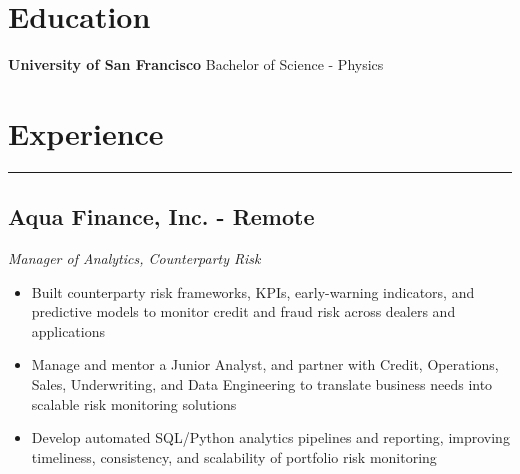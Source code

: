 \documentclass[11pt,a4paper]{article}
\newenvironment{myitemize}
{ \begin{itemize}[label={--}, leftmargin=*]
		\setlength{\itemsep}{0pt}
		\setlength{\parskip}{0pt}
		\setlength{\parsep}{0pt}     }
	{ \end{itemize}                  }
\begin{document}
	

\section*{Education}
	\vspace{-8mm} %
	\noindent\makebox[\linewidth]{\rule{\textwidth}{0.4pt}}
	\textbf{University of San Francisco} \hfill Bachelor of Science - Physics \\

		\vspace{-10mm} %

	\section*{Experience}
	\vspace{-4mm} %
	\hrule
	\vspace{2mm} %
	
	
	
\subsection*{Aqua Finance, Inc. - Remote \hfill
	\vspace{-1mm}
	 }
\vspace{-1.5mm}
\textit{Manager of Analytics, Counterparty Risk}
\vspace{-2.5mm}
\begin{myitemize}
	\item Built counterparty risk frameworks, KPIs, early-warning indicators, and predictive models to monitor credit and fraud risk across dealers and applications
	\item Manage and mentor a Junior Analyst, and partner with Credit, Operations, Sales, Underwriting, and Data Engineering to translate business needs into scalable risk monitoring solutions
	\item Develop automated SQL/Python analytics pipelines and reporting, improving timeliness, consistency, and scalability of portfolio risk monitoring
\end{myitemize}
	


		\vspace{-7mm} %
\end{document}
